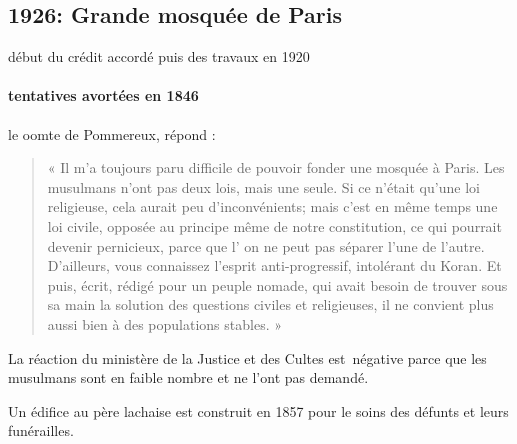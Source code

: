 \subsection{1926: Grande mosquée de Paris}
début du crédit accordé puis des travaux en 1920

\paragraph{tentatives avortées en 1846}
le oomte de Pommereux, répond : 
\begin{quote}
« Il m'a
toujours paru difficile de pouvoir fonder une mosquée à Paris. Les
musulmans n'ont pas deux lois, mais une seule. Si ce n'était
qu'une loi religieuse, cela aurait peu d'inconvénients; mais c'est
en même temps une loi civile, opposée au principe même de notre
constitution, ce qui pourrait devenir pernicieux, parce que l' on ne
peut pas séparer l'une de l'autre. D'ailleurs, vous connaissez
l'esprit anti-progressif, intolérant du Koran. Et puis, écrit, rédigé
pour un peuple nomade, qui avait besoin de trouver sous sa main
la solution des questions civiles et religieuses, il ne convient plus
aussi bien à des populations stables. »
\end{quote}
La réaction du ministère de la Justice et des Cultes est~négative parce que les musulmans sont en faible nombre et ne l'ont pas demandé.

Un édifice au père lachaise est construit en 1857 pour le soins des défunts et leurs funérailles.

